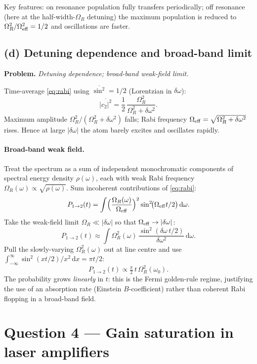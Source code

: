 \documentclass[11pt]{article}
\newcommand{\de}{\mathrm{d}}
\begin{document}
Key features: on resonance population fully transfers periodically; off resonance (here at the half-width-$\Omega_R$ detuning) the maximum population is reduced to $\Omega_R^{2}/\Omega_{\rm eff}^{2}=1/2$ and oscillations are faster.

\subsection*{(d) Detuning dependence and broad-band limit}

\textbf{Problem.} \emph{Detuning dependence; broad-band weak-field limit.}

Time-average \eqref{eq:rabi} using $\overline{\sin^{2}}=1/2$ (Lorentzian in $\delta\omega$):
\[
\overline{|c_2|^{2}}=\frac{1}{2}\,\frac{\Omega_R^{2}}{\Omega_R^{2}+\delta\omega^{2}}.
\]
Maximum amplitude $\Omega_R^{2}/(\Omega_R^{2}+\delta\omega^{2})$ falls; Rabi frequency $\Omega_{\rm eff}=\sqrt{\Omega_R^{2}+\delta\omega^{2}}$ rises. Hence at large $|\delta\omega|$ the atom barely excites and oscillates rapidly.

\paragraph{Broad-band weak field.} Treat the spectrum as a sum of independent monochromatic components of spectral energy density $\rho(\omega)$, each with weak Rabi frequency $\Omega_R(\omega)\propto\sqrt{\rho(\omega)}$. Sum incoherent contributions of \eqref{eq:rabi}:
\[
P_{1\to 2}(t)=\int\Bigl(\frac{\Omega_R(\omega)}{\Omega_{\rm eff}}\Bigr)^{2}\sin^{2}\!\bigl(\Omega_{\rm eff}t/2\bigr)\,\de\omega.
\]
Take the weak-field limit $\Omega_R\ll|\delta\omega|$ so that $\Omega_{\rm eff}\to|\delta\omega|$:
\[
P_{1\to 2}(t)\approx\int\Omega_R^{2}(\omega)\,\frac{\sin^{2}(\delta\omega\, t/2)}{\delta\omega^{2}}\,\de\omega.
\]
Pull the slowly-varying $\Omega_R^{2}(\omega)$ out at line centre and use $\int_{-\infty}^{\infty}\sin^{2}(x t/2)/x^{2}\,\de x=\pi t/2$:
\[
P_{1\to 2}(t)\propto\tfrac{\pi}{2}\,t\,\Omega_R^{2}(\omega_0).
\]
The probability grows \emph{linearly} in $t$: this is the Fermi golden-rule regime, justifying the use of an absorption rate (Einstein $B$-coefficient) rather than coherent Rabi flopping in a broad-band field.

\section*{Question 4 --- Gain saturation in laser amplifiers}
\end{document}
